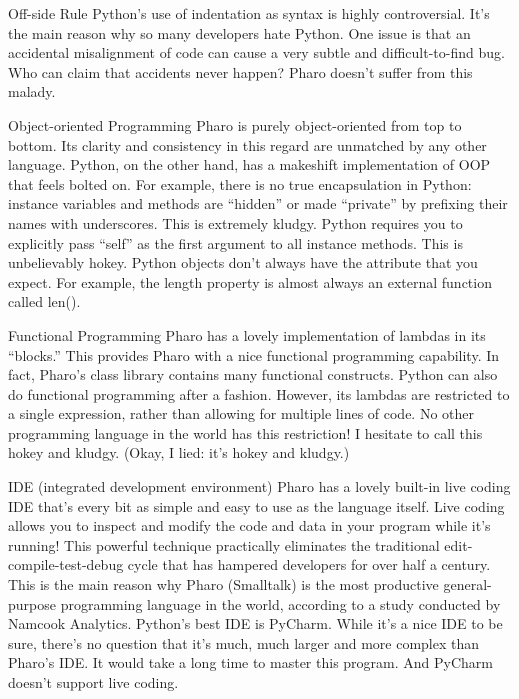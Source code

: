 \documentclass{beamer}
\begin{document}
\begin{frame}{Off-side Rule}
Python’s use of indentation as syntax is highly controversial. It’s the main reason why so many developers hate Python. One issue is that an accidental misalignment of code can cause a very subtle and difficult-to-find bug. Who can claim that accidents never happen?
Pharo doesn’t suffer from this malady.
\end{frame}
\begin{frame}{Object-oriented Programming}
Pharo is purely object-oriented from top to bottom. Its clarity and consistency in this regard are unmatched by any other language.
Python, on the other hand, has a makeshift implementation of OOP that feels bolted on. For example, there is no true encapsulation in Python: instance variables and methods are “hidden” or made “private” by prefixing their names with underscores. This is extremely kludgy.
Python requires you to explicitly pass “self” as the first argument to all instance methods. This is unbelievably hokey.
Python objects don’t always have the attribute that you expect. For example, the length property is almost always an external function called len().
\end{frame}
\begin{frame}{Functional Programming}
Pharo has a lovely implementation of lambdas in its “blocks.” This provides Pharo with a nice functional programming capability. In fact, Pharo’s class library contains many functional constructs.
Python can also do functional programming after a fashion. However, its lambdas are restricted to a single expression, rather than allowing for multiple lines of code. No other programming language in the world has this restriction! I hesitate to call this hokey and kludgy. (Okay, I lied: it’s hokey and kludgy.)
\end{frame}
\begin{frame}{IDE (integrated development environment)}
Pharo has a lovely built-in live coding IDE that’s every bit as simple and easy to use as the language itself. Live coding allows you to inspect and modify the code and data in your program while it’s running! This powerful technique practically eliminates the traditional edit-compile-test-debug cycle that has hampered developers for over half a century. This is the main reason why Pharo (Smalltalk) is the most productive general-purpose programming language in the world, according to a study conducted by Namcook Analytics.
Python’s best IDE is PyCharm. While it’s a nice IDE to be sure, there’s no question that it’s much, much larger and more complex than Pharo’s IDE. It would take a long time to master this program.
And PyCharm doesn’t support live coding.
\end{frame}
\end{document}
